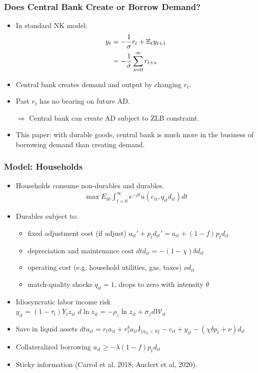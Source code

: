 \documentclass[english,xcolor=svgnames]{beamer}
\begin{document}
\begin{frame}
    \frametitle{Does Central Bank Create or Borrow Demand?}
    \begin{itemize}
    	\item In standard NK model:
    	\begin{align*}
    		y_t  &= -\frac{1}{\sigma}r_t + \mathbb{E}_t y_{t+1} \\
    		&= -\frac{1}{\sigma}\sum_{s=0}^{\infty}r_{t+s}
    	\end{align*}
    	\item Central bank creates demand and output by changing $r_t$.
    	\item Past $r_t$ has no bearing on future AD.
    	\item[$\Rightarrow$] Central bank can create AD subject to ZLB constraint.
    	\item This paper: with durable goods, central bank is much more in the business of borrowing demand than creating demand.
    \end{itemize}
\end{frame}


\begin{frame}
\frametitle{Model: Households}
\begin{itemize}
\item Households consume non-durables and durables.
	\begin{align*}
		\max  E_{i0}\int_{t=0}^{\infty}e^{-\rho t}   u\left( c_{it}, q_{it} d_{it} \right)  d t 
	\end{align*}
\item Durables subject to:
	\begin{itemize}
	\item fixed adjustment cost (if adjust) $a_{it}'+p_t d_{it}' = a_{it}+(1-f)p_t d_{it}$
	\item depreciation and maintenance cost $dt d_{it} = -(1-\chi)\delta d_{it} $
	\item operating cost (e.g. household utilities, gas, taxes) $\nu  d_{it}$
	\item match-quality shocks $q_{it} =1$, drops to zero with intensity $\theta$
	\end{itemize}
\item Idiosyncratic labor income risk\\ $y_{it} = \left(1-\tau_t\right) Y_t z_{it}$\hspace{2cm}
$d \ln z_{it} = -\rho_z \ln z_{it} + \sigma_z d \mathcal W_{it} $
\item Save in liquid assets
         $dt a_{it} = r_t a_{it} + r_t^b a_{it}I_{\{a_{it}<0\}} - c_{it} +  y_{it}-(\chi\delta p_t + \nu)  d_{it}$ 
\item Collateralized borrowing $a_{it} \ge -\lambda(1-f)p_{t} d_{it}$
\item Sticky information (Carrol et al, 2018; Auclert et al, 2020).
\end{itemize}
\end{frame}
\end{document}
